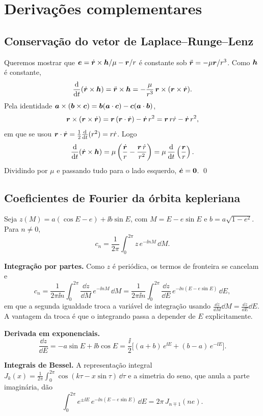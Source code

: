 \section{Derivações complementares}\label{ap:derivacoes}

\subsection{Conservação do vetor de Laplace--Runge--Lenz}

Queremos mostrar que $\bm{e} = \dot{\bm{r}}\times\bm{h}/\mu - \bm{r}/r$ é constante sob $\ddot{\bm{r}} = -\mu\bm{r}/r^3$. Como $\bm{h}$ é constante,
\[
  \frac{\mathrm{d}}{\mathrm{d} t}(\dot{\bm{r}}\times\bm{h}) = \ddot{\bm{r}}\times\bm{h} = -\frac{\mu}{r^3}\,\bm{r}\times(\bm{r}\times\dot{\bm{r}}).
\]
Pela identidade $\bm{a}\times(\bm{b}\times\bm{c}) = \bm{b}(\bm{a}\cdot\bm{c}) - \bm{c}(\bm{a}\cdot\bm{b})$,
\[
  \bm{r}\times(\bm{r}\times\dot{\bm{r}}) = \bm{r}\,(\bm{r}\cdot\dot{\bm{r}}) - \dot{\bm{r}}\,r^2 = \bm{r}\,r\dot r - \dot{\bm{r}}\,r^2,
\]
em que se usou $\bm{r}\cdot\dot{\bm{r}} = \frac12\frac{\mathrm{d}}{\mathrm{d} t}(r^2) = r\dot r$. Logo
\[
  \frac{\mathrm{d}}{\mathrm{d} t}(\dot{\bm{r}}\times\bm{h}) = \mu\left(\frac{\dot{\bm{r}}}{r} - \frac{\bm{r}\,\dot r}{r^2}\right) = \mu\,\frac{\mathrm{d}}{\mathrm{d} t}\left(\frac{\bm{r}}{r}\right).
\]
Dividindo por $\mu$ e passando tudo para o lado esquerdo, $\dot{\bm{e}} = \bm{0}$. \qed

\subsection{Coeficientes de Fourier da órbita kepleriana}

Seja $z(M) = a(\cos E - e) + \ii b\sin E$, com $M = E - e\sin E$ e $b = a\sqrt{1-e^2}$. Para $n\neq0$,
\[
  c_n = \frac{1}{2\pi}\int_0^{2\pi} z\,e^{-\ii nM}\,\dd M.
\]

\medskip\noindent\textbf{Integração por partes.} Como $z$ é periódica, os termos de fronteira se cancelam e
\[
  c_n = \frac{1}{2\pi\ii n}\int_0^{2\pi}\frac{\dd z}{\dd M}\,e^{-\ii nM}\,\dd M
      = \frac{1}{2\pi\ii n}\int_0^{2\pi}\frac{\dd z}{\dd E}\,e^{-\ii n(E - e\sin E)}\,\dd E,
\]
em que a segunda igualdade troca a variável de integração usando $\frac{\dd z}{\dd M}\dd M = \frac{\dd z}{\dd E}\dd E$. A vantagem da troca é que o integrando passa a depender de $E$ explicitamente.

\medskip\noindent\textbf{Derivada em exponenciais.}
\[
  \frac{\dd z}{\dd E} = -a\sin E + \ii b\cos E = \frac{\ii}{2}\bigl[(a+b)\,e^{\ii E} + (b-a)\,e^{-\ii E}\bigr].
\]

\medskip\noindent\textbf{Integrais de Bessel.} A representação integral $J_k(x) = \frac{1}{2\pi}\int_0^{2\pi}\cos(k\tau - x\sin\tau)\,\dd\tau$ e a simetria do seno, que anula a parte imaginária, dão
\[
  \int_0^{2\pi} e^{\pm\ii E}\,e^{-\ii n(E - e\sin E)}\,\dd E = 2\pi\,J_{n\mp1}(ne).
\]

